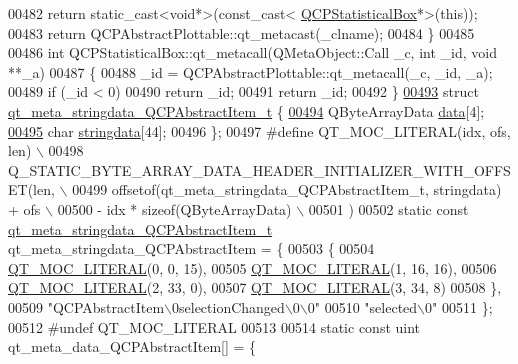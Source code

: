\begin{DoxyCode}
00482         \textcolor{keywordflow}{return} \textcolor{keyword}{static\_cast<}\textcolor{keywordtype}{void}*\textcolor{keyword}{>}(\textcolor{keyword}{const\_cast<} \hyperlink{a00050}{QCPStatisticalBox}*\textcolor{keyword}{>}(\textcolor{keyword}{this}));
00483     \textcolor{keywordflow}{return} QCPAbstractPlottable::qt\_metacast(\_clname);
00484 \}
00485 
00486 \textcolor{keywordtype}{int} QCPStatisticalBox::qt\_metacall(QMetaObject::Call \_c, \textcolor{keywordtype}{int} \_id, \textcolor{keywordtype}{void} **\_a)
00487 \{
00488     \_id = QCPAbstractPlottable::qt\_metacall(\_c, \_id, \_a);
00489     \textcolor{keywordflow}{if} (\_id < 0)
00490         \textcolor{keywordflow}{return} \_id;
00491     \textcolor{keywordflow}{return} \_id;
00492 \}
\hypertarget{a00067_source_l00493}{}\hyperlink{a00067}{00493} \textcolor{keyword}{struct }\hyperlink{a00067_d7/d6e/a00190}{qt\_meta\_stringdata\_QCPAbstractItem\_t} \{
\hypertarget{a00067_source_l00494}{}\hyperlink{a00067_ab4317fd8db7c91bab9009e558b7cb145}{00494}     QByteArrayData \hyperlink{a00067_ab4317fd8db7c91bab9009e558b7cb145}{data}[4];
\hypertarget{a00067_source_l00495}{}\hyperlink{a00067_ade6e562aa7d6defc621f68d53679440b}{00495}     \textcolor{keywordtype}{char} \hyperlink{a00067_ade6e562aa7d6defc621f68d53679440b}{stringdata}[44];
00496 \};
00497 \textcolor{preprocessor}{#define QT\_MOC\_LITERAL(idx, ofs, len) \(\backslash\)}
00498 \textcolor{preprocessor}{    Q\_STATIC\_BYTE\_ARRAY\_DATA\_HEADER\_INITIALIZER\_WITH\_OFFSET(len, \(\backslash\)}
00499 \textcolor{preprocessor}{    offsetof(qt\_meta\_stringdata\_QCPAbstractItem\_t, stringdata) + ofs \(\backslash\)}
00500 \textcolor{preprocessor}{        - idx * sizeof(QByteArrayData) \(\backslash\)}
00501 \textcolor{preprocessor}{    )}
00502 \textcolor{keyword}{static} \textcolor{keyword}{const} \hyperlink{a00067_d7/d6e/a00190}{qt\_meta\_stringdata\_QCPAbstractItem\_t} 
      qt\_meta\_stringdata\_QCPAbstractItem = \{
00503     \{
00504 \hyperlink{a00067_a75bb9482d242cde0a06c9dbdc6b83abe}{QT\_MOC\_LITERAL}(0, 0, 15),
00505 \hyperlink{a00067_a75bb9482d242cde0a06c9dbdc6b83abe}{QT\_MOC\_LITERAL}(1, 16, 16),
00506 \hyperlink{a00067_a75bb9482d242cde0a06c9dbdc6b83abe}{QT\_MOC\_LITERAL}(2, 33, 0),
00507 \hyperlink{a00067_a75bb9482d242cde0a06c9dbdc6b83abe}{QT\_MOC\_LITERAL}(3, 34, 8)
00508     \},
00509     \textcolor{stringliteral}{"QCPAbstractItem\(\backslash\)0selectionChanged\(\backslash\)0\(\backslash\)0"}
00510     \textcolor{stringliteral}{"selected\(\backslash\)0"}
00511 \};
00512 \textcolor{preprocessor}{#undef QT\_MOC\_LITERAL}
00513 
00514 \textcolor{keyword}{static} \textcolor{keyword}{const} uint qt\_meta\_data\_QCPAbstractItem[] = \{

\end{DoxyCode}
